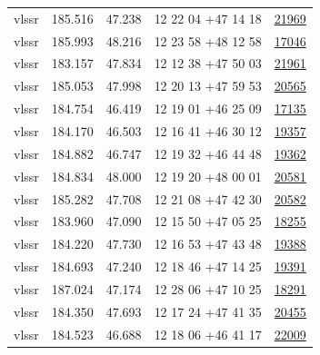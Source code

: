 \documentclass{article}
\begin{document}
\begin{longtable}{c|c|c|c|c}
\hline
vlssr & 185.516 & 47.238 & 12 22 04 +47 14 18 &  \href{http://banana.transientskp.org/r4/vlo_KmeulenTrap4P23/runningcatalog/21969}{21969} \\
vlssr & 185.993 & 48.216 & 12 23 58 +48 12 58 &  \href{http://banana.transientskp.org/r4/vlo_KmeulenTrap4P23/runningcatalog/17046}{17046} \\
vlssr & 183.157 & 47.834 & 12 12 38 +47 50 03 &  \href{http://banana.transientskp.org/r4/vlo_KmeulenTrap4P23/runningcatalog/21961}{21961} \\
vlssr & 185.053 & 47.998 & 12 20 13 +47 59 53 &  \href{http://banana.transientskp.org/r4/vlo_KmeulenTrap4P23/runningcatalog/20565}{20565} \\
vlssr & 184.754 & 46.419 & 12 19 01 +46 25 09 &  \href{http://banana.transientskp.org/r4/vlo_KmeulenTrap4P23/runningcatalog/17135}{17135} \\
vlssr & 184.170 & 46.503 & 12 16 41 +46 30 12 &  \href{http://banana.transientskp.org/r4/vlo_KmeulenTrap4P23/runningcatalog/19357}{19357} \\
vlssr & 184.882 & 46.747 & 12 19 32 +46 44 48 &  \href{http://banana.transientskp.org/r4/vlo_KmeulenTrap4P23/runningcatalog/19362}{19362} \\
vlssr & 184.834 & 48.000 & 12 19 20 +48 00 01 &  \href{http://banana.transientskp.org/r4/vlo_KmeulenTrap4P23/runningcatalog/20581}{20581} \\
vlssr & 185.282 & 47.708 & 12 21 08 +47 42 30 &  \href{http://banana.transientskp.org/r4/vlo_KmeulenTrap4P23/runningcatalog/20582}{20582} \\
vlssr & 183.960 & 47.090 & 12 15 50 +47 05 25 &  \href{http://banana.transientskp.org/r4/vlo_KmeulenTrap4P23/runningcatalog/18255}{18255} \\
vlssr & 184.220 & 47.730 & 12 16 53 +47 43 48 &  \href{http://banana.transientskp.org/r4/vlo_KmeulenTrap4P23/runningcatalog/19388}{19388} \\
vlssr & 184.693 & 47.240 & 12 18 46 +47 14 25 &  \href{http://banana.transientskp.org/r4/vlo_KmeulenTrap4P23/runningcatalog/19391}{19391} \\
vlssr & 187.024 & 47.174 & 12 28 06 +47 10 25 &  \href{http://banana.transientskp.org/r4/vlo_KmeulenTrap4P23/runningcatalog/18291}{18291} \\
vlssr & 184.350 & 47.693 & 12 17 24 +47 41 35 &  \href{http://banana.transientskp.org/r4/vlo_KmeulenTrap4P23/runningcatalog/20455}{20455} \\
vlssr & 184.523 & 46.688 & 12 18 06 +46 41 17 &  \href{http://banana.transientskp.org/r4/vlo_KmeulenTrap4P23/runningcatalog/22009}{22009} \\

\end{longtable}
\end{document}
